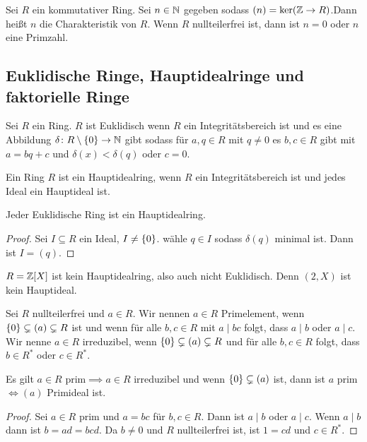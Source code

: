 \begin{Def}
    Sei \(R\) ein kommutativer Ring. Sei \(n\in \mathbb{N}\) gegeben sodass \((n)=\ker(\mathbb{Z}\to R)\).Dann heißt \(n\) die Charakteristik von \(R\). Wenn \(R\) nullteilerfrei ist, dann ist \(n=0\) oder \(n\) eine Primzahl.
\end{Def}
\subsection{Euklidische Ringe, Hauptidealringe und faktorielle Ringe}
\begin{Def}
    Sei \(R\) ein Ring. \(R\) ist Euklidisch wenn \(R\) ein Integritätsbereich ist und es eine Abbildung \(\delta\colon R\setminus\{0\}\to\mathbb{N}\) gibt sodass für \(a,q\in R\) mit \(q\neq 0\) es \(b,c\in R\) gibt mit \(a=bq+c\) und \(\delta(x)<\delta(q)\) oder \(c=0\).
\end{Def}
\begin{Def}
    Ein Ring \(R\) ist ein Hauptidealring, wenn \(R\) ein Integritätsbereich ist und jedes Ideal ein Hauptideal ist.
\end{Def}
\begin{Satz}
    Jeder Euklidische Ring ist ein Hauptidealring.
\end{Satz}
\begin{proof}
    Sei \(I\subseteq R\) ein Ideal, \(I\neq \{0\}\). wähle \(q\in I\) sodass \(\delta(q)\) minimal ist. Dann ist \(I=(q)\).
\end{proof}
\begin{Bsp}
    \(R=\mathbb{Z}[X]\) ist kein Hauptidealring, also auch nicht Euklidisch. Denn \((2,X)\) ist kein Hauptideal.
\end{Bsp}
\begin{Def}
    Sei \(R\) nullteilerfrei und \(a\in R\). Wir nennen \(a\in R\) Primelement, wenn \(\{0\}\subsetneq (a)\subsetneq R\) ist und wenn für alle \(b,c\in R\) mit \(a\mid bc\) folgt, dass \(a\mid b\) oder \(a\mid c\).\\
    Wir nenne \(a\in R\) irreduzibel, wenn \(\{0\}\subsetneq (a)\subsetneq R\) und für alle \(b,c\in R\) folgt, dass \(b\in R^*\) oder \(c\in R^*\).
\end{Def}
\begin{Bem}
    Es gilt \(a\in R\text{ prim}\implies a\in R\text{ irreduzibel}\) und wenn \(\{0\}\subsetneq (a)\) ist, dann ist \(a\) prim \(\iff (a)\) Primideal ist.
\end{Bem}
\begin{proof}
    Sei \(a\in R\) prim und \(a=bc\) für \(b,c\in R\). Dann ist \(a\mid b\) oder \(a\mid c\). Wenn \(a\mid b\) dann ist \(b=ad=bcd\). Da \(b\neq 0\) und \(R\) nullteilerfrei ist, ist \(1=cd\) und \(c\in R^*\).
\end{proof}
